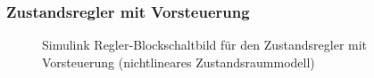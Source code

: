 \subsubsection{Zustandsregler mit Vorsteuerung}

\begin{figure}[H]
    \centering
    \caption[Regler mit Vorsteuerung Simulink (nichtlinear)]{Simulink Regler-Blockschaltbild für den Zustandsregler mit Vorsteuerung (nichtlineares Zustandsraummodell)}
    \label{fig:Bild32}
\end{figure}


